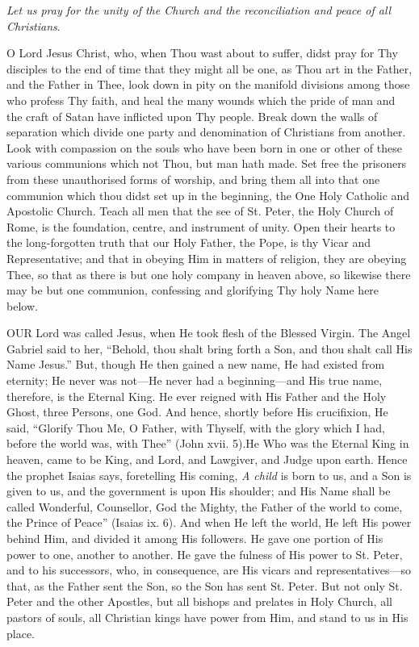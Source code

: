 \emph{Let us pray for the unity of
the Church and the reconciliation and peace of all Christians}.

O Lord Jesus Christ, who, when
Thou wast about to suffer, didst pray for Thy disciples to the end of
time that they might all be one, as Thou art in the Father, and the
Father in Thee, look down in pity on the manifold divisions among those
who profess Thy faith, and heal the many wounds which the pride of man
and the craft of Satan have inflicted upon Thy people. Break down the
walls of separation which divide one party and denomination of
Christians from another. Look with compassion on the souls who have been
born in one or other of these various communions which not Thou, but man
hath made. Set free the prisoners from these unauthorised forms of
worship, and bring them all into that one communion which thou didst set
up in the beginning, the One Holy Catholic and Apostolic Church. Teach
all men that the see of St. Peter, the Holy Church of Rome, is the
foundation, centre, and instrument of unity. Open their hearts to the
long-forgotten truth that our Holy Father, the Pope, is thy Vicar and
Representative; and that in obeying Him in matters of religion, they are
obeying Thee, so that as there is but one holy company in heaven above,
so likewise there may be but one communion, confessing and glorifying
Thy holy Name here below.


OUR Lord was called
Jesus, when He took flesh of the Blessed Virgin. The Angel Gabriel said
to her, ``Behold, thou shalt bring forth a Son, and thou shalt call His
Name Jesus.'' But, though He then gained a new name, He had existed from
eternity; He never was not—He never had a beginning—and His true
name, therefore, is the Eternal King. He ever reigned with His Father
and the Holy Ghost, three Persons, one God. And hence, shortly before
His crucifixion, He said, ``Glorify Thou Me, O Father, with Thyself, with
the glory which I had, before the world was, with Thee'' (John xvii. 5).\emph{}He Who was the Eternal King in heaven, came to be King, and Lord,
and Lawgiver, and Judge upon earth. Hence the prophet Isaias says,
foretelling His coming, \emph{A child} is born to us, and a Son is given
to us, and the government is upon His shoulder; and His Name shall be
called Wonderful, Counsellor, God the Mighty, the Father of the world to
come, the Prince of Peace'' (Isaias ix. 6). And when He left the world,
He left His power behind Him, and divided it among His followers. He
gave one portion of His power to one, another to another. He gave the
fulness of His power to St. Peter, and to his successors, who, in
consequence, are His vicars and representatives—so that, as the Father
sent the Son, so the Son has sent St. Peter. But not only St.
Peter and the other Apostles, but all bishops and prelates in Holy
Church, all pastors of souls, all Christian kings have power from Him,
and stand to us in His place.

